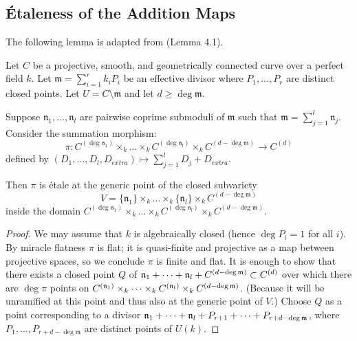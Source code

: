 \subsection{\'Etaleness of the Addition Maps}\label{subsection:etaleness_addition_maps}

The following lemma is adapted from \cite{takeuchi2018blow} (Lemma 4.1).
\begin{lemma}\label{lemma:takeuchi_lemma}
     Let $C$ be a projective, smooth, and geometrically connected curve over a perfect field $k$.
     Let $\mathfrak{m} = \sum_{i=1}^{r} k_i P_i$ be an effective divisor where $P_1, \dots, P_r$ are distinct closed points.
     Let $U = C \setminus \mathfrak{m}$ and let $d \geq \deg \mathfrak{m}$.

     Suppose $\mathfrak{n}_1, \dots, \mathfrak{n}_l$ are pairwise coprime submoduli of $\mathfrak{m}$ such that $\mathfrak{m} = \sum_{j=1}^l \mathfrak{n}_j$.
     Consider the summation morphism:
     \[
     \pi : C^{(\deg \mathfrak{n}_1)} \times_k \dots \times_k C^{(\deg \mathfrak{n}_l)} \times_k C^{(d - \deg \mathfrak{m})} \longrightarrow C^{(d)}
     \]
     defined by $(D_1, \dots, D_l, D_{extra}) \mapsto \sum_{j=1}^l D_j + D_{extra}$.

     Then $\pi$ is étale at the generic point of the closed subvariety
     \[
     V = \{\mathfrak{n}_1\} \times_k \dots \times_k \{\mathfrak{n}_l\} \times_k C^{(d - \deg \mathfrak{m})}
     \]
     inside the domain $C^{(\deg \mathfrak{n}_1)} \times_k \dots \times_k C^{(\deg \mathfrak{n}_l)} \times_k C^{(d - \deg \mathfrak{m})}$.
\end{lemma}
\begin{proof}
     We may assume that $k$ is algebraically closed (hence $\deg P_i = 1$ for all $i$). By miracle flatness $\pi$ is flat; it is quasi-finite and projective as a map between projective spaces,
     so we conclude $\pi$ is finite and flat.
     It is enough to show that there exists a closed point $Q$ of $\mathfrak{n}_1 + \dots + \mathfrak{n}_l + C^{(d - \deg \mathfrak{m})} \subset C^{(d)}$
     over which there are $\deg \pi$ points on $C^{(\mathfrak{n}_1)} \times_k \dots \times_k C^{(\mathfrak{n}_l)} \times_k C^{(d - \deg \mathfrak{m})}$. (Because it will be unramified
     at this point and thus also at the generic point of $V$.)
     Choose $Q$ as a point corresponding to a divisor
     $\mathfrak{n}_1 + \dots + \mathfrak{n}_l + P_{r+1} + \dots + P_{r+d - \deg \mathfrak{m}}$, where $P_1, \dots, P_{r+d - \deg \mathfrak{m}}$ are distinct points of $U(k)$.
\end{proof}

